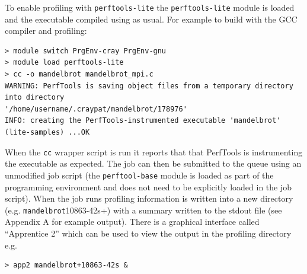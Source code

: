\documentclass[a4paper,titlepage]{article}
\begin{document}
To enable profiling with \verb+perftools-lite+ the \verb+perftools-lite+ module is loaded and the executable compiled using as usual. For example to build with the GCC compiler and profiling:
\begin{verbatim}
> module switch PrgEnv-cray PrgEnv-gnu 
> module load perftools-lite
> cc -o mandelbrot mandelbrot_mpi.c 
WARNING: PerfTools is saving object files from a temporary directory into directory 
'/home/username/.craypat/mandelbrot/178976'
INFO: creating the PerfTools-instrumented executable 'mandelbrot' (lite-samples) ...OK
\end{verbatim}
When the \verb+cc+ wrapper script is run it reports that that PerfTools is instrumenting the executable as expected.
The job can then be submitted to the queue using an unmodified job script (the \texttt{perftool-base} module is loaded as part of the programming environment and does not need to be explicitly loaded in the job script). When the job runs profiling information is written into a new directory (e.g. \verb+mandelbrot+10863-42s+) with a summary written to the stdout file (see Appendix A for example output). There is a graphical interface called ``Apprentice 2'' which can be used to view the output in the profiling directory e.g. 
\begin{verbatim}
> app2 mandelbrot+10863-42s &
\end{verbatim}
\end{document}
